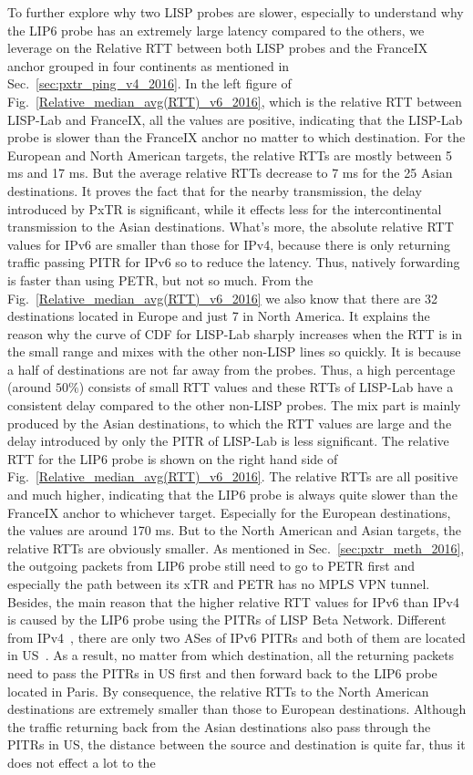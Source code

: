 To further explore why two LISP probes are slower, especially to understand why the LIP6 probe has an extremely large latency compared to the others, we leverage on the Relative RTT between both LISP probes and the FranceIX anchor grouped in four continents as mentioned in Sec.~\ref{sec:pxtr_ping_v4_2016}. In the left figure of Fig.~\ref{Relative_median_avg(RTT)_v6_2016}, which is the relative RTT between LISP-Lab and FranceIX, all the values are positive, indicating that the LISP-Lab probe is slower than the FranceIX anchor no matter to which destination. For the European and North American targets, the relative RTTs are mostly between 5 ms and 17 ms. But the average relative RTTs decrease to 7 ms for the 25 Asian destinations. It proves the fact that for the nearby transmission, the delay introduced by PxTR is significant, while it effects less for the intercontinental transmission to the Asian destinations. What's more, the absolute relative RTT values for IPv6 are smaller than those for IPv4, because there is only returning traffic passing PITR for IPv6 so to reduce the latency. Thus, natively forwarding is faster than using PETR, but not so much. From the Fig.~\ref{Relative_median_avg(RTT)_v6_2016} we also know that there are 32 destinations located in Europe and just 7 in North America. It explains the reason why the curve of CDF for LISP-Lab sharply increases when the RTT is in the small range and mixes with the other non-LISP lines so quickly. It is because a half of destinations are not far away from the probes. Thus, a high percentage (around $50\%$) consists of small RTT values and these RTTs of LISP-Lab have a consistent delay compared to the other non-LISP probes. The mix part is mainly produced by the Asian destinations, to which the RTT values are large and the delay introduced by only the PITR of LISP-Lab is less significant. The relative RTT for the LIP6 probe is shown on the right hand side of Fig.~\ref{Relative_median_avg(RTT)_v6_2016}. The relative RTTs are all positive and much higher, indicating that the LIP6 probe is always quite slower than the FranceIX anchor to whichever target. Especially for the European destinations, the values are around 170 ms. But to the North American and Asian targets, the relative RTTs are obviously smaller. As mentioned in Sec.~\ref{sec:pxtr_meth_2016}, the outgoing packets from LIP6 probe still need to go to PETR first and especially the path between its xTR and PETR has no MPLS VPN tunnel. Besides, the main reason that the higher relative RTT values for IPv6 than IPv4 is caused by the LIP6 probe using the PITRs of LISP Beta Network. Different from IPv4~\cite{bgpv4}, there are only two ASes of IPv6 PITRs and both of them are located in US~\cite{bgpv6}. As a result, no matter from which destination, all the returning packets need to pass the PITRs in US first and then forward back to the LIP6 probe located in Paris. By consequence, the relative RTTs to the North American destinations are extremely smaller than those to European destinations. Although the traffic returning back from the Asian destinations also pass through the PITRs in US, the distance between the source and destination is quite far, thus it does not effect a lot to the 